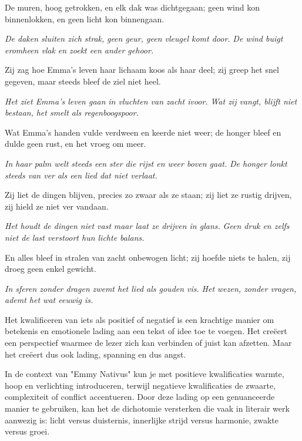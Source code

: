 De muren, hoog getrokken,
en elk dak was dichtgegaan;
geen wind kon binnenlokken,
en geen licht kon binnengaan.

\textit{De daken sluiten zich strak,}
\textit{geen geur, geen vleugel komt door.}
\textit{De wind buigt eromheen vlak}
\textit{en zoekt een ander gehoor.}

Zij zag hoe Emma's leven
haar lichaam koos als haar deel;
zij greep het snel gegeven,
maar steeds bleef de ziel niet heel.

\textit{Het ziet Emma's leven gaan}
\textit{in vluchten van zacht ivoor.}
\textit{Wat zij vangt, blijft niet bestaan,}
\textit{het smelt als regenboogspoor.}


Wat Emma's handen vulde
verdween en keerde niet weer;
de honger bleef en dulde
geen rust, en het vroeg om meer.

\textit{In haar palm welt steeds een ster}
\textit{die rijst en weer boven gaat.}
\textit{De honger lonkt steeds van ver}
\textit{als een lied dat niet verlaat.}

Zij liet de dingen blijven,
precies zo zwaar als ze staan;
zij liet ze rustig drijven,
zij hield ze niet ver vandaan.

\textit{Het houdt de dingen niet vast}
\textit{maar laat ze drijven in glans.}
\textit{Geen druk en zelfs niet de last}
\textit{verstoort hun lichte balans.}

En alles bleef in stralen
van zacht onbewogen licht;
zij hoefde niets te halen,
zij droeg geen enkel gewicht.

\textit{In sferen zonder dragen}
\textit{zwemt het lied als gouden vis.}
\textit{Het wezen, zonder vragen,}
\textit{ademt het wat eeuwig is.}

Het kwalificeren van iets als positief of negatief is een krachtige manier om betekenis en emotionele lading aan een tekst of idee toe te voegen. Het creëert een perspectief waarmee de lezer zich kan verbinden of juist kan afzetten. Maar het creëert dus ook lading, spanning en dus angst.

In de context van "Emmy Nativus" kun je met positieve kwalificaties warmte, hoop en verlichting introduceren, terwijl negatieve kwalificaties de zwaarte, complexiteit of conflict accentueren. Door deze lading op een genuanceerde manier te gebruiken, kan het de dichotomie versterken die vaak in literair werk aanwezig is: licht versus duisternis, innerlijke strijd versus harmonie, zwakte versus groei.

